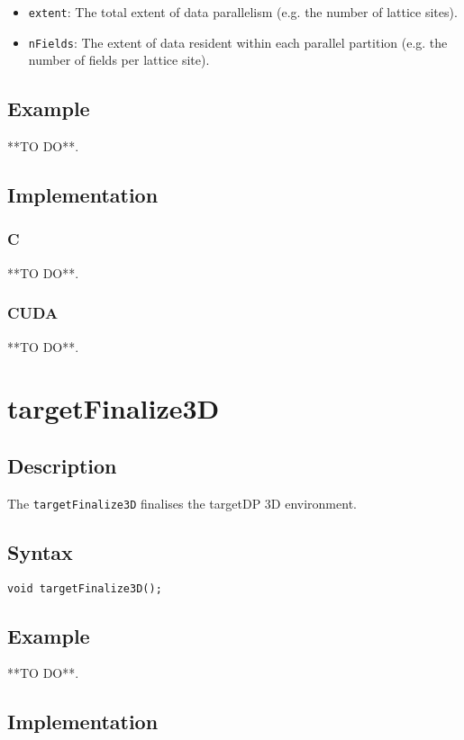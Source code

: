 \begin{itemize}
\item \verb+extent+: The total extent of data parallelism (e.g. the number of lattice sites).
\item \verb+nFields+: The extent of data resident within each parallel partition (e.g. the number of fields per lattice site).
\end{itemize}


\subsection{Example}
**TO DO**.
\subsection{Implementation}
\subsubsection{C}
**TO DO**.
\subsubsection{CUDA}
**TO DO**.

\newpage
\section{targetFinalize3D}

\subsection{Description}

The \verb+targetFinalize3D+ finalises the targetDP 3D environment.

\subsection{Syntax}
\begin{verbatim}
void targetFinalize3D();
\end{verbatim}

\subsection{Example}
**TO DO**.

\subsection{Implementation}
